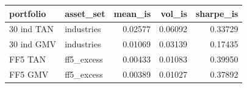 \begin{tabular}{llrrr}
\toprule
portfolio & asset\_set & mean\_is & vol\_is & sharpe\_is \\
\midrule
30 ind TAN & industries & 0.02577 & 0.06092 & 0.33729 \\
30 ind GMV & industries & 0.01069 & 0.03139 & 0.17435 \\
FF5 TAN & ff5\_excess & 0.00433 & 0.01083 & 0.39950 \\
FF5 GMV & ff5\_excess & 0.00389 & 0.01027 & 0.37892 \\
\bottomrule
\end{tabular}
